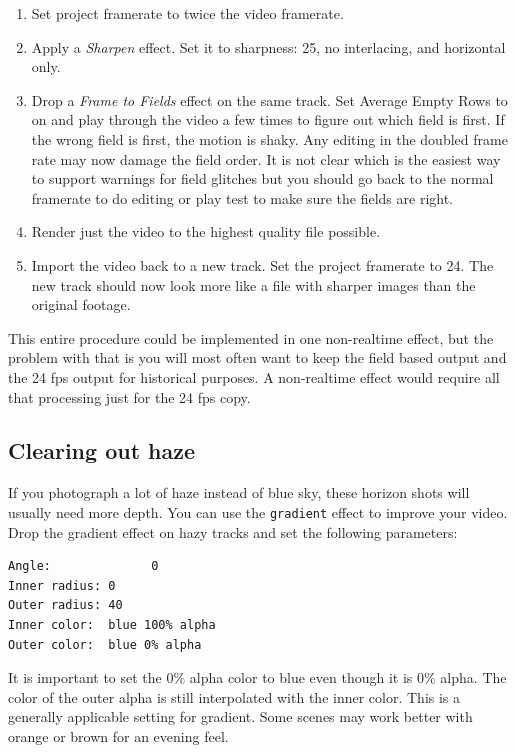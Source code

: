 \begin{enumerate}
	\item Set project framerate to twice the video framerate.
	\item Apply a \textit{Sharpen} effect. Set it to sharpness: 25, no interlacing, and horizontal only.
	\item Drop a \textit{Frame to Fields} effect on the same track. Set Average Empty Rows to on and play through 
	the video a few times to figure out which field is first. If the wrong field is first, the motion is shaky.
	Any editing in the doubled frame rate may now damage the field order. It is not clear which is the
	easiest way to support warnings for field glitches but you should go back to the normal framerate to
	do editing or play test to make sure the fields are right.
	\item Render just the video to the highest quality file possible.
	\item Import the video back to a new track. Set the project framerate to 24. The new track should now
	look more like a file with sharper images than the original footage.
\end{enumerate}

This entire procedure could be implemented in one non-realtime effect, but the problem with that is you will most often want to keep the field based output and the 24 fps output for historical purposes. A non-realtime effect would require all that processing just for the 24 fps copy.

\subsection{Clearing out haze}%
\label{sub:clearing_out_haze}

If you photograph a lot of haze instead of blue sky, these horizon shots will usually need more depth. You can use the \texttt{gradient} effect to improve your video. Drop the gradient effect on hazy tracks and set the following parameters:

\begin{lstlisting}[numbers=none]
Angle: 				0
Inner radius: 0
Outer radius: 40
Inner color:  blue 100% alpha 
Outer color:  blue 0% alpha
\end{lstlisting}

It is important to set the $0\%$ alpha color to blue even though it is $0\%$ alpha. The color of the outer alpha is still interpolated with the inner color. This is a generally applicable setting for gradient. Some scenes may work better with orange or brown for an evening feel.

